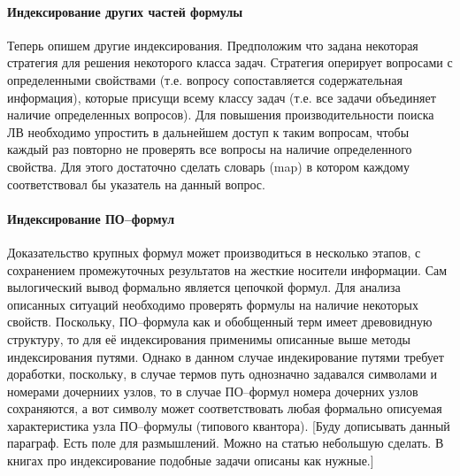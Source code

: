 \paragraph{Индексирование других частей формулы}
Теперь опишем другие  индексирования. Предположим что  задана некоторая стратегия для решения некоторого класса задач. Стратегия оперирует вопросами с определенными свойствами (т.е. вопросу сопоставляется содержательная информация), которые присущи всему классу задач (т.е. все задачи объединяет наличие определенных вопросов). Для повышения производительности поиска ЛВ необходимо упростить в дальнейшем доступ к таким вопросам, чтобы каждый раз повторно не проверять  все вопросы на наличие определенного свойства. Для этого достаточно сделать словарь (map) в котором каждому  соответствовал бы указатель на данный вопрос. 


\paragraph{Индексирование ПО--формул} Доказательство крупных формул может производиться в несколько этапов, с сохранением промежуточных результатов на жесткие носители информации. Сам вылогический вывод формально является цепочкой формул. Для анализа описанных ситуаций необходимо проверять формулы на наличие некоторых свойств. Поскольку, ПО--формула как и обобщенный терм имеет древовидную структуру, то для её индексирования применимы описанные выше методы индексирования путями. Однако в данном случае индекирование путями требует доработки, поскольку, в случае термов путь однозначно задавался символами и номерами дочерниих узлов, то в случае ПО--формул номера дочерних узлов сохраняются, а вот символу может соответствовать любая формально описуемая характеристика узла ПО--формулы (типового квантора). [Буду дописывать данный параграф. Есть поле для размышлений. Можно на статью небольшую сделать. В книгах про индексирование подобные задачи описаны как нужные.] 


